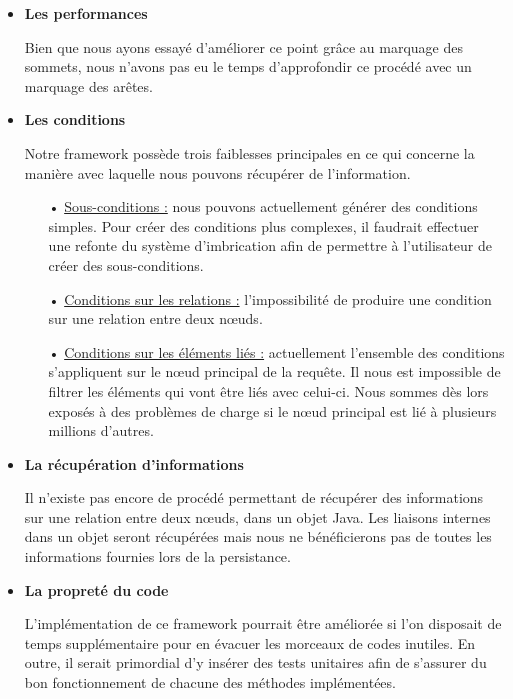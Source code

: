 \documentclass[a4paper,fleqn,12pt,oneside]{report}
\begin{document}
\begin{itemize}
\item \textbf{Les performances}

\quad Bien que nous ayons essayé d'améliorer ce point grâce au marquage des sommets, nous n'avons pas eu le temps d'approfondir ce procédé avec un marquage des arêtes.

\item \textbf{Les conditions}

\quad Notre framework possède trois faiblesses principales en ce qui concerne la manière avec laquelle nous pouvons récupérer de l'information.
\begin{itemize}
	\item[•] \underline{Sous-conditions :} nous pouvons actuellement générer des conditions simples. Pour créer des conditions plus complexes, il faudrait effectuer une refonte du système d'imbrication afin de permettre à l'utilisateur de créer des sous-conditions. 
	\item[•] \underline{Conditions sur les relations :} l'impossibilité de produire une condition sur une relation entre deux nœuds.
	\item[•] \underline{Conditions sur les éléments liés :} actuellement l'ensemble des conditions s'appliquent sur le nœud principal de la requête. Il nous est impossible de filtrer les éléments qui vont être liés avec celui-ci. Nous sommes dès lors exposés à des problèmes de charge si le nœud principal est lié à plusieurs millions d'autres.
\end{itemize}

\item \textbf{La récupération d'informations}

\quad Il n'existe pas encore de procédé permettant de récupérer des informations sur une relation entre deux nœuds, dans un objet Java. Les  liaisons internes dans un objet seront récupérées mais nous ne bénéficierons pas de toutes les informations fournies lors de la persistance.

\item \textbf{La propreté du code}

\quad L'implémentation de ce framework pourrait être améliorée si l'on disposait de temps supplémentaire pour en évacuer les morceaux de codes inutiles. En outre, il serait primordial d'y insérer des tests unitaires afin de s'assurer du bon fonctionnement de chacune des méthodes implémentées.

\end{itemize}  
\end{document}
